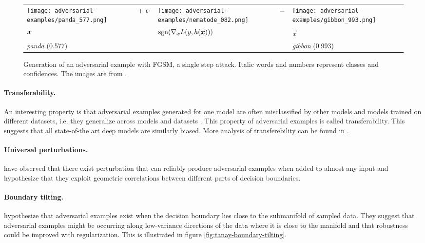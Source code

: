 \documentclass[twocolumn]{article}
\begin{document}
\begin{figure}
	\centering
	{\small
		\begin{tabular}{>{\centering\arraybackslash}m{}m{.1in}>{\centering\arraybackslash}m{}m{.05in}>{\centering\arraybackslash}m{}}
			\centering\arraybackslash
			\texttt{[image: adversarial-examples/panda\_577.png]} &%
			\centering\arraybackslash%
			$\centering +\ \epsilon \cdot$ &%
			\texttt{[image: adversarial-examples/nematode\_082.png]} &%
			$\centering =$ & %
			\texttt{[image: adversarial-examples/gibbon\_993.png]} \\
			$\centering \vec x$     &%
			& $\sgn\del{\nabla_{\vec x} L(y,h(\vec x))}$ & & $\tilde{\vec x}$ \\
			\emph{panda} (0.577) & & & & \emph{gibbon} (0.993) 
		\end{tabular}
	}
	\caption{Generation of an adversarial example with FGSM, a single step attack. Italic words and numbers represent classes and confidences. The images are from \citet{Goodfellow:2014:EHAE}.}
	\label{fig:fgsm-adversarial-example}
\end{figure}

\paragraph{Transferability.} An interesting property is that adversarial examples generated for one model are often misclassified by other models and models trained on different datasets, i.e. they generalize across models and datasets \citep{Szegedy:2013:IPNN}. This property of adversarial examples is called transferability. This suggests that all state-of-the art deep models are similarly biased. More analysis of transferebility can be found in \citet{Papernot:2016:TMLPBBAAS,Liu:2016:DTAEBBA,Tramer:2017:STAE}. 

\paragraph{Universal perturbations.} \citet{Moosavi-Dezfooli:2016:UAP} have observed that there exist perturbation that can reliably produce adversarial examples when added to almost any input and hypothesize that they exploit geometric correlations between different parts of decision boundaries. 

\paragraph{Boundary tilting.} \citet{Tanay:2016:ABTPPAE} hypothesize that adversarial examples exist when the decision boundary lies close to the submanifold of sampled data. They suggest that adversarial examples might be occurring along low-variance directions of the data where it is close to the manifold and that robustness could be improved with regularization. This is illustrated in figure \ref{fig:tanay-boundary-tilting}.
\end{document}
